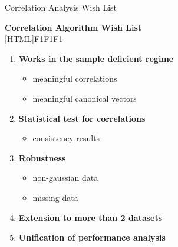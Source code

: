 \documentclass[8pt]{beamer}
\begin{document}
\begin{frame}{Correlation Analysis Wish List}
  \addtocounter{framenumber}{-1}

  \begin{center}
    \textbf{Correlation Algorithm Wish List}\\[1ex]
[HTML]{F1F1F1}{\parbox{0.8\textwidth}{%
    \begin{enumerate}
    \item \textbf{Works in the sample deficient regime}
      \begin{itemize}
      \item {\textcolor{texthigh}{meaningful correlations \checkmark}}
      \item meaningful canonical vectors
      \end{itemize}
    \item {\textcolor{texthigh}{\textbf{Statistical test for correlations} \checkmark}}
      \begin{itemize}
      \item {\textcolor{texthigh}{consistency results \checkmark}}
      \end{itemize}
    \item {\textcolor{texthigh}{\textbf{Robustness} \checkmark}}
      \begin{itemize}
      \item {\textcolor{texthigh}{non-gaussian data \checkmark}}
      \item {\textcolor{texthigh}{missing data \checkmark}}
      \end{itemize}
    \item \textcolor{texthigh}{\textbf{Extension to more than 2 datasets} \checkmark}
    \item \textbf{Unification of performance analysis}
    \end{enumerate}
}}
\end{center}

\end{frame}
\end{document}
